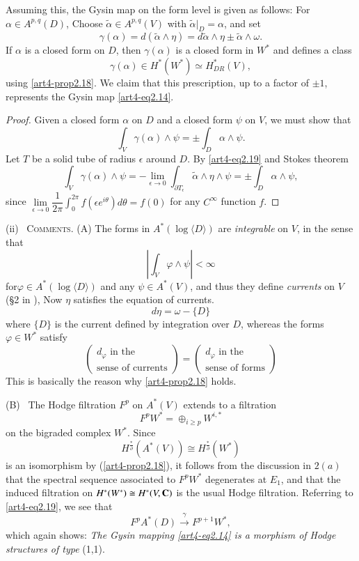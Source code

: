 Assuming this, the Gysin map on the form level is given as follows: For $\alpha \in A^{p,q} (D)$, Choose $\tilde{\alpha} \in A^{p,q} (V)$ with $\tilde{\alpha}|_D = \alpha$, and set
\begin{equation}
\gamma(\alpha) = d (\tilde{\alpha} \wedge \eta) = d \tilde{\alpha} \wedge \eta \pm \tilde{\alpha} \wedge \omega. \label{art4-eq2.19}
\end{equation}
If $\alpha$ is a closed form on $D$, then $\gamma (\alpha)$ is a closed form in $W^\ast$ and defines a class
$$
\gamma (\alpha) \in H^\ast  (W^\ast) \simeq H^\ast_{DR} (V),
$$
using \eqref{art4-prop2.18}. We claim that this prescription, up to a factor of $\pm 1$, represents the Gysin map \eqref{art4-eq2.14}.

\begin{proof}
Given a closed form $\alpha$ on $D$ and a closed form $\psi$ on $V$, we must show that
$$
\int_V \gamma (\alpha) \wedge \psi = \pm \int_D \alpha \wedge \psi.
$$
Let $T$ be a solid tube of radius $\epsilon$ around $D$. By \eqref{art4-eq2.19} and Stokes theorem
$$
\int_V \gamma (\alpha) \wedge \psi = - \lim\limits_{\epsilon \to 0} \int_{\partial T_\epsilon} \tilde{\alpha} \wedge \eta \wedge \psi = \pm \int_D \alpha \wedge \psi,
$$
since $\lim\limits_{\epsilon \to 0} \dfrac{1}{2 \pi} \int^{2\pi}_0 f (\epsilon e^{i\theta}) d\theta = f (0)$ for any $C^\infty$ function $f$.
\end{proof}

\medskip
\noindent
(ii)~ \textsc{Comments.} (A) The forms in $A^\ast (\log \langle D \rangle)$ are \textit{integrable} on $V$, in the sense that
$$
|\int_V \varphi \wedge \psi| < \infty
$$
for\pageoriginale $\varphi \in A^\ast (\log \langle D \rangle)$ and any $\psi\in A^\ast (V)$, and thus they define \textit{currents} on $V$ (\cf \S 2 in \cite{art4-key18}), Now $\eta$ satisfies the equation of currents.
$$
d \eta = \omega - \{D\}
$$
where $\{D\}$ is the current defined by integration over $D$, whereas the forms $\varphi \in W^\ast$ satisfy
$$
\begin{pmatrix}
d_\varphi \text{ in the }\\
\text{sense of currents}
\end{pmatrix} = 
\begin{pmatrix}
d_\varphi \text{ in the}\\
\text{sense of forms}
\end{pmatrix}
$$
This is basically the reason why \eqref{art4-prop2.18} holds.

\medskip
\noindent
(B)~ The Hodge filtration $F^p$ on $A^\ast(V)$ extends to a filtration
$$
F^p W^\ast = \oplus_{i \geqslant p} W^{i,\ast}
$$
on the bigraded complex $W^\ast$. Since 
$$
H^{\frac{\ast}{\partial}} (A^\ast (V)) \cong H^{\frac{\ast}{\partial}} (W^\ast)
$$
is an isomorphism by (\ref{art4-prop2.18}), it follows from the discussion in $2(a)$ that the spectral sequence associated to $F^p W^\ast$ degenerates at $E_1$, and that the induced filtration on $H^\ast (W^\ast) \cong H^\ast(V,\mathbf{C})$ is the usual Hodge filtration. Referring to \eqref{art4-eq2.19}, we see that
$$
F^p A^\ast (D) \xrightarrow{\gamma} F^{p+1} W^\ast,
$$ 
which again shows: \textit{The Gysin mapping \eqref{art4-eq2.14} is a morphism of Hodge structures of type} (1,1).

